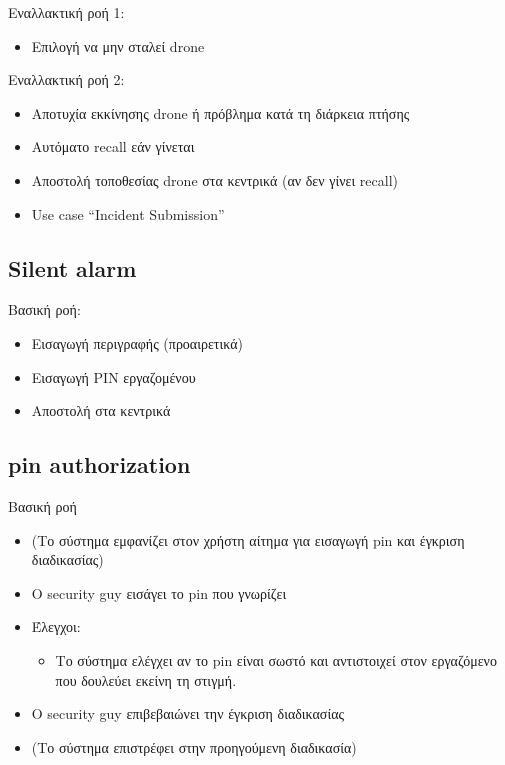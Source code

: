 \documentclass{article}
\begin{document}
\noindent Εναλλακτική ροή 1:
\begin{itemize}
    \item Επιλογή να μην σταλεί drone
\end{itemize}

\noindent Εναλλακτική ροή 2:
\begin{itemize}
    \item Αποτυχία εκκίνησης drone ή πρόβλημα κατά τη διάρκεια πτήσης
    \item Αυτόματο recall εάν γίνεται
    \item Αποστολή τοποθεσίας drone στα κεντρικά (αν δεν γίνει recall)
    \item Use case “Incident Submission”
\end{itemize}

\subsection{Silent alarm}

\noindent Βασική ροή:
\begin{itemize}
    \item Εισαγωγή περιγραφής (προαιρετικά)
    \item Εισαγωγή PIN εργαζομένου
    \item Αποστολή στα κεντρικά
\end{itemize}

\subsection{pin authorization}

\noindent Βασική ροή
\begin{itemize}
    \item (Το σύστημα εμφανίζει στον χρήστη αίτημα για εισαγωγή pin και έγκριση διαδικασίας)
    \item Ο security guy εισάγει το pin που γνωρίζει
    \item Έλεγχοι:
    \begin{itemize}
        \item Το σύστημα ελέγχει αν το pin είναι σωστό και αντιστοιχεί στον εργαζόμενο που δουλεύει εκείνη τη στιγμή.
    \end{itemize}
    \item Ο security guy επιβεβαιώνει την έγκριση διαδικασίας 
    \item (Το σύστημα επιστρέφει στην προηγούμενη διαδικασία)
\end{itemize}
\end{document}
